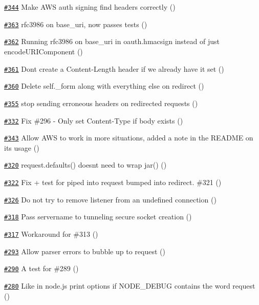 \begin{DoxyItemize}
\item \href{https://github.com/request/request/pull/344}{\tt \#344} Make A\+WS auth signing find headers correctly ()
\item \href{https://github.com/request/request/pull/363}{\tt \#363} rfc3986 on base\+\_\+uri, now passes tests ()
\item \href{https://github.com/request/request/pull/362}{\tt \#362} Running {\ttfamily rfc3986} on {\ttfamily base\+\_\+uri} in {\ttfamily oauth.\+hmacsign} instead of just {\ttfamily encode\+U\+R\+I\+Component} ()
\item \href{https://github.com/request/request/pull/361}{\tt \#361} Don\textquotesingle{}t create a Content-\/\+Length header if we already have it set ()
\item \href{https://github.com/request/request/pull/360}{\tt \#360} Delete self.\+\_\+form along with everything else on redirect ()
\item \href{https://github.com/request/request/pull/355}{\tt \#355} stop sending erroneous headers on redirected requests ()
\item \href{https://github.com/request/request/pull/332}{\tt \#332} Fix \#296 -\/ Only set Content-\/\+Type if body exists ()
\item \href{https://github.com/request/request/pull/343}{\tt \#343} Allow A\+WS to work in more situations, added a note in the R\+E\+A\+D\+ME on its usage ()
\item \href{https://github.com/request/request/pull/320}{\tt \#320} request.\+defaults() doesn\textquotesingle{}t need to wrap jar() ()
\item \href{https://github.com/request/request/pull/322}{\tt \#322} Fix + test for piped into request bumped into redirect. \#321 ()
\item \href{https://github.com/request/request/pull/326}{\tt \#326} Do not try to remove listener from an undefined connection ()
\item \href{https://github.com/request/request/pull/318}{\tt \#318} Pass servername to tunneling secure socket creation ()
\item \href{https://github.com/request/request/pull/317}{\tt \#317} Workaround for \#313 ()
\item \href{https://github.com/request/request/pull/293}{\tt \#293} Allow parser errors to bubble up to request ()
\item \href{https://github.com/request/request/pull/290}{\tt \#290} A test for \#289 ()
\item \href{https://github.com/request/request/pull/280}{\tt \#280} Like in node.\+js print options if N\+O\+D\+E\+\_\+\+D\+E\+B\+UG contains the word request ()

\end{DoxyItemize}

